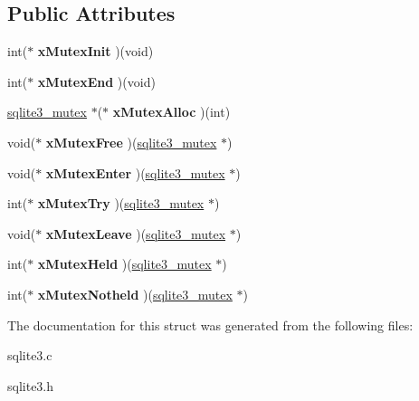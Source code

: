\subsection*{Public Attributes}
\begin{DoxyCompactItemize}
\item 
\hypertarget{structsqlite3__mutex__methods_af0a78d79b6029444d4a2ac7c474030d4}{int($\ast$ {\bfseries x\-Mutex\-Init} )(void)}\label{structsqlite3__mutex__methods_af0a78d79b6029444d4a2ac7c474030d4}

\item 
\hypertarget{structsqlite3__mutex__methods_a4963efb4bfede244d4d2a14510dbfe68}{int($\ast$ {\bfseries x\-Mutex\-End} )(void)}\label{structsqlite3__mutex__methods_a4963efb4bfede244d4d2a14510dbfe68}

\item 
\hypertarget{structsqlite3__mutex__methods_a1092d5c1659c494c5235e884def5e275}{\hyperlink{structsqlite3__mutex}{sqlite3\-\_\-mutex} $\ast$($\ast$ {\bfseries x\-Mutex\-Alloc} )(int)}\label{structsqlite3__mutex__methods_a1092d5c1659c494c5235e884def5e275}

\item 
\hypertarget{structsqlite3__mutex__methods_a4e58d446a7225ce91073eb0af91d219a}{void($\ast$ {\bfseries x\-Mutex\-Free} )(\hyperlink{structsqlite3__mutex}{sqlite3\-\_\-mutex} $\ast$)}\label{structsqlite3__mutex__methods_a4e58d446a7225ce91073eb0af91d219a}

\item 
\hypertarget{structsqlite3__mutex__methods_ac60f7bb165e9770949a8a2b2c2632830}{void($\ast$ {\bfseries x\-Mutex\-Enter} )(\hyperlink{structsqlite3__mutex}{sqlite3\-\_\-mutex} $\ast$)}\label{structsqlite3__mutex__methods_ac60f7bb165e9770949a8a2b2c2632830}

\item 
\hypertarget{structsqlite3__mutex__methods_a45682df41bdfcb267a696090c80ebd06}{int($\ast$ {\bfseries x\-Mutex\-Try} )(\hyperlink{structsqlite3__mutex}{sqlite3\-\_\-mutex} $\ast$)}\label{structsqlite3__mutex__methods_a45682df41bdfcb267a696090c80ebd06}

\item 
\hypertarget{structsqlite3__mutex__methods_acfa193f9130bfc68caf7f1849bcd0dac}{void($\ast$ {\bfseries x\-Mutex\-Leave} )(\hyperlink{structsqlite3__mutex}{sqlite3\-\_\-mutex} $\ast$)}\label{structsqlite3__mutex__methods_acfa193f9130bfc68caf7f1849bcd0dac}

\item 
\hypertarget{structsqlite3__mutex__methods_a5d30a95c614bc08fe156c9ea0f0d88e8}{int($\ast$ {\bfseries x\-Mutex\-Held} )(\hyperlink{structsqlite3__mutex}{sqlite3\-\_\-mutex} $\ast$)}\label{structsqlite3__mutex__methods_a5d30a95c614bc08fe156c9ea0f0d88e8}

\item 
\hypertarget{structsqlite3__mutex__methods_a7bc1edfd01c67c6dcee26299bc31a7bf}{int($\ast$ {\bfseries x\-Mutex\-Notheld} )(\hyperlink{structsqlite3__mutex}{sqlite3\-\_\-mutex} $\ast$)}\label{structsqlite3__mutex__methods_a7bc1edfd01c67c6dcee26299bc31a7bf}

\end{DoxyCompactItemize}


The documentation for this struct was generated from the following files\-:\begin{DoxyCompactItemize}
\item 
sqlite3.\-c\item 
sqlite3.\-h\end{DoxyCompactItemize}
